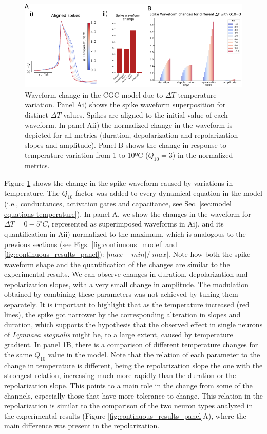 \begin{figure}[hbt!]
	\centering    
	\includegraphics[width=\textwidth]{img/laser/Figure5.pdf}
	\caption{Waveform change in the CGC-model due to $\Delta T$ temperature variation. Panel Ai) shows the spike waveform superposition for distinct $\Delta T$ values. Spikes are aligned to the initial value of each waveform. In panel Aii) the normalized change in the waveform is depicted for all metrics (duration, depolarization and repolarization slopes and amplitude). Panel B shows the change in response to temperature variation from 1 to 10ºC ($Q_{10}=3$) in the normalized metrics.}
	\label{fig:temperature model}
\end{figure}

Figure \ref{fig:temperature model} shows the change in the spike waveform caused by variations in temperature. The $Q_{10}$ factor was added to every dynamical equation in the model (i.e., conductances, activation gates and capacitance, see Sec. \ref{sec:model equations temperature}). In panel A, we show the changes in the waveform for $\Delta T=0-5^{\circ}C$, represented as superimposed waveforms in Ai), and its quantification in Aii) normalized to the maximum, which is analogous to the previous sections (see Figs. \ref{fig:continuous_model} and \ref{fig:continuous_results_panel}): $|max-min|/|max|$. Note how both the spike waveform shape and the quantification of the changes are similar to the experimental results. We can observe changes in duration, depolarization and repolarization slopes, with a very small change in amplitude.
The modulation obtained by combining these parameters was not achieved by tuning them separately. It is important to highlight that as the temperature increased (red lines), the spike got narrower by the corresponding alteration in slopes and duration, which supports the hypothesis that the observed effect in single neurons of \textit{Lymnaea stagnalis} might be, to a large extent, caused by temperature gradient. In panel \ref{fig:temperature model}B, there is a comparison of different temperature changes for the same $Q_{10}$ value in the model. Note that the relation of each parameter to the change in temperature is different, being the repolarization slope the one with the strongest relation, increasing much more rapidly than the duration or the repolarization slope. This points to a main role in the change from some of the channels, especially those that have more tolerance to change. This relation in the repolarization is similar to the comparison of the two neuron types analyzed in the experimental results (Figure \ref{fig:continuous_results_panel}A), where the main difference was present in the repolarization.

